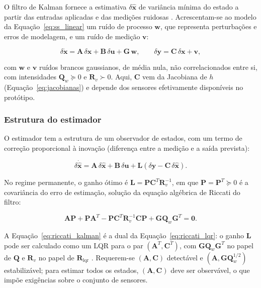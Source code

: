O filtro de Kalman fornece a estimativa $\delta\hat{\mathbf{x}}$ de variância mínima do estado a partir das entradas aplicadas e das medições ruidosas \cite{kalman1960,kalmanbucy1961}. Acrescentam-se ao modelo da Equação~\eqref{eq:ss_linear} um ruído de processo $\mathbf{w}$, que representa perturbações e erros de modelagem, e um ruído de medição $\mathbf{v}$:

\begin{equation}\label{eq:ss_ruido}
\delta\dot{\mathbf{x}} = \mathbf{A}\,\delta\mathbf{x} + \mathbf{B}\,\delta\mathbf{u} + \mathbf{G}\,\mathbf{w},\qquad
\delta\mathbf{y} = \mathbf{C}\,\delta\mathbf{x} + \mathbf{v},
\end{equation}

\noindent com $\mathbf{w}$ e $\mathbf{v}$ ruídos brancos gaussianos, de média nula, não correlacionados entre si, com intensidades $\mathbf{Q}_w\succeq0$ e $\mathbf{R}_v\succ0$. Aqui, $\mathbf{C}$ vem da Jacobiana de $h$ (Equação~\eqref{eq:jacobianas}) e depende dos sensores efetivamente disponíveis no protótipo.

\subsubsection{Estrutura do estimador}

O estimador tem a estrutura de um observador de estados, com um termo de correção proporcional à inovação (diferença entre a medição e a saída prevista):

\begin{equation}\label{eq:observador}
\delta\dot{\hat{\mathbf{x}}} = \mathbf{A}\,\delta\hat{\mathbf{x}} + \mathbf{B}\,\delta\mathbf{u} + \mathbf{L}\left(\delta\mathbf{y}-\mathbf{C}\,\delta\hat{\mathbf{x}}\right).
\end{equation}

\noindent No regime permanente, o ganho ótimo é $\mathbf{L}=\mathbf{P}\mathbf{C}^{T}\mathbf{R}_v^{-1}$, em que $\mathbf{P}=\mathbf{P}^T\succeq0$ é a covariância do erro de estimação, solução da equação algébrica de Riccati do filtro:

\begin{equation}\label{eq:riccati_kalman}
\mathbf{A}\mathbf{P}+\mathbf{P}\mathbf{A}^{T}-\mathbf{P}\mathbf{C}^{T}\mathbf{R}_v^{-1}\mathbf{C}\mathbf{P}+\mathbf{G}\mathbf{Q}_w\mathbf{G}^{T}=\mathbf{0}.
\end{equation}

\noindent A Equação~\eqref{eq:riccati_kalman} é a dual da Equação~\eqref{eq:riccati_lqr}: o ganho $\mathbf{L}$ pode ser calculado como um LQR para o par $(\mathbf{A}^T,\mathbf{C}^T)$, com $\mathbf{G}\mathbf{Q}_w\mathbf{G}^T$ no papel de $\mathbf{Q}$ e $\mathbf{R}_v$ no papel de $\mathbf{R}_{\mathrm{lqr}}$ \cite{anderson1990,simon2006}. Requerem-se $(\mathbf{A},\mathbf{C})$ detectável e $(\mathbf{A},\mathbf{G}\mathbf{Q}_w^{1/2})$ estabilizável; para estimar todos os estados, $(\mathbf{A},\mathbf{C})$ deve ser observável, o que impõe exigências sobre o conjunto de sensores.

